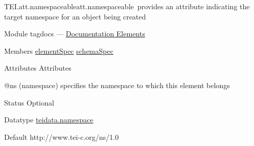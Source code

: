 \begin{reflist}
\item[]\begin{specHead}{TEI.att.namespaceable}{att.namespaceable} provides an attribute indicating the target namespace for an object being created\end{specHead} 
    \item[{Module}]
  tagdocs — \hyperref[TD]{Documentation Elements}
    \item[{Members}]
  \hyperref[TEI.elementSpec]{elementSpec} \hyperref[TEI.schemaSpec]{schemaSpec}
    \item[{Attributes}]
  Attributes\hfil\\[-10pt]\begin{sansreflist}
    \item[@ns]
  (namespace) specifies the namespace to which this element belongs
\begin{reflist}
    \item[{Status}]
  Optional
    \item[{Datatype}]
  \hyperref[TEI.teidata.namespace]{teidata.namespace}
    \item[{Default}]
  http://www.tei-c.org/ns/1.0
\end{reflist}  
\end{sansreflist}  
\end{reflist}  
